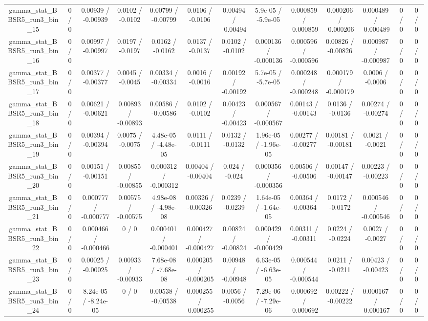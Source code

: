 \documentclass[10pt]{article}
\begin{document}
\begin{table}[htbp]
\begin{center}
\begin{tabular}{|c|c|c|c|c|c|c|c|c|c|c|c|c|}
  gamma_stat_BBSR5_run3_bin_15 & 0 / 0 & 0.00939 / -0.00939 & 0.0102 / -0.0102 & 0.00799 / -0.00799 & 0.0106 / -0.0106 & 0.00494 / -0.00494 & 5.9e-05 / -5.9e-05 & 0.000859 / -0.000859 & 0.000206 / -0.000206 & 0.000489 / -0.000489 & 0 / 0 & 0 / 0 \\ 
  gamma_stat_BBSR5_run3_bin_16 & 0 / 0 & 0.00997 / -0.00997 & 0.0197 / -0.0197 & 0.0162 / -0.0162 & 0.0137 / -0.0137 & 0.0102 / -0.0102 & 0.000136 / -0.000136 & 0.000596 / -0.000596 & 0.00826 / -0.00826 & 0.000987 / -0.000987 & 0 / 0 & 0 / 0 \\ 
  gamma_stat_BBSR5_run3_bin_17 & 0 / 0 & 0.00377 / -0.00377 & 0.0045 / -0.0045 & 0.00334 / -0.00334 & 0.0016 / -0.0016 & 0.00192 / -0.00192 & 5.7e-05 / -5.7e-05 & 0.000248 / -0.000248 & 0.000179 / -0.000179 & 0.0006 / -0.0006 & 0 / 0 & 0 / 0 \\ 
  gamma_stat_BBSR5_run3_bin_18 & 0 / 0 & 0.00621 / -0.00621 & 0.00893 / -0.00893 & 0.00586 / -0.00586 & 0.0102 / -0.0102 & 0.00423 / -0.00423 & 0.000567 / -0.000567 & 0.00143 / -0.00143 & 0.0136 / -0.0136 & 0.00274 / -0.00274 & 0 / 0 & 0 / 0 \\ 
  gamma_stat_BBSR5_run3_bin_19 & 0 / 0 & 0.00394 / -0.00394 & 0.0075 / -0.0075 & 4.48e-05 / -4.48e-05 & 0.0111 / -0.0111 & 0.0132 / -0.0132 & 1.96e-05 / -1.96e-05 & 0.00277 / -0.00277 & 0.00181 / -0.00181 & 0.0021 / -0.0021 & 0 / 0 & 0 / 0 \\ 
  gamma_stat_BBSR5_run3_bin_20 & 0 / 0 & 0.00151 / -0.00151 & 0.00855 / -0.00855 & 0.000312 / -0.000312 & 0.00404 / -0.00404 & 0.024 / -0.024 & 0.000356 / -0.000356 & 0.00506 / -0.00506 & 0.00147 / -0.00147 & 0.00223 / -0.00223 & 0 / 0 & 0 / 0 \\ 
  gamma_stat_BBSR5_run3_bin_21 & 0 / 0 & 0.000777 / -0.000777 & 0.00575 / -0.00575 & 4.98e-08 / -4.98e-08 & 0.00326 / -0.00326 & 0.0239 / -0.0239 & 1.64e-05 / -1.64e-05 & 0.00364 / -0.00364 & 0.0172 / -0.0172 & 0.000546 / -0.000546 & 0 / 0 & 0 / 0 \\ 
  gamma_stat_BBSR5_run3_bin_22 & 0 / 0 & 0.000466 / -0.000466 & 0 / 0 & 0.000401 / -0.000401 & 0.000427 / -0.000427 & 0.00824 / -0.00824 & 0.000429 / -0.000429 & 0.00311 / -0.00311 & 0.0224 / -0.0224 & 0.0027 / -0.0027 & 0 / 0 & 0 / 0 \\ 
  gamma_stat_BBSR5_run3_bin_23 & 0 / 0 & 0.00025 / -0.00025 & 0.00933 / -0.00933 & 7.68e-08 / -7.68e-08 & 0.000205 / -0.000205 & 0.00948 / -0.00948 & 6.63e-05 / -6.63e-05 & 0.000544 / -0.000544 & 0.0211 / -0.0211 & 0.00423 / -0.00423 & 0 / 0 & 0 / 0 \\ 
  gamma_stat_BBSR5_run3_bin_24 & 0 / 0 & 8.24e-05 / -8.24e-05 & 0 / 0 & 0.00538 / -0.00538 & 0.000255 / -0.000255 & 0.0056 / -0.0056 & 7.29e-06 / -7.29e-06 & 0.000692 / -0.000692 & 0.00222 / -0.00222 & 0.000167 / -0.000167 & 0 / 0 & 0 / 0 \\ 

\end{tabular}
\end{center}
\end{table}
\end{document}
